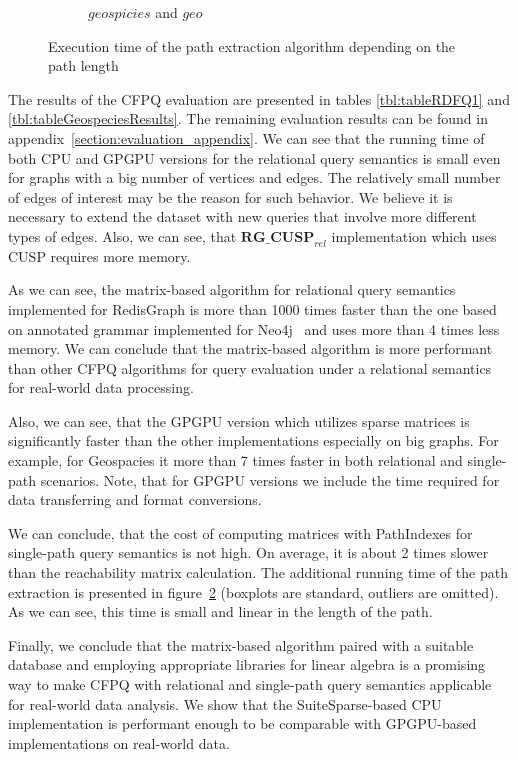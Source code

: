 \begin{figure}
\begin{subfigure}{0.32\textwidth}
		\caption{$geospicies$ and $geo$} \label{fig:extractTimeGeo}
	\end{subfigure}
	\caption{Execution time of the path extraction algorithm depending on the path length}
	\label{fig:extractTime}
\end{figure}

The results of the CFPQ evaluation are presented in tables \ref{tbl:tableRDFQ1} and \ref{tbl:tableGeospeciesResults}. The remaining evaluation results can be found in appendix~\ref{section:evaluation_appendix}.
We can see that the running time of both CPU and GPGPU versions for the relational query semantics is small even for graphs with a big number of vertices and edges.
The relatively small number of edges of interest may be the reason for such behavior.
We believe it is necessary to extend the dataset with new queries that involve more different types of edges.
Also, we can see, that $\textbf{RG\_CUSP}_{\textit{rel}}$ implementation which uses CUSP requires more memory.

As we can see, the matrix-based algorithm for relational query semantics implemented for RedisGraph is more than 1000 times faster than the one based on annotated grammar implemented for Neo4j~\cite{Kuijpers:2019:ESC:3335783.3335791} and uses more than 4 times less memory.
We can conclude that the matrix-based algorithm is more performant than other CFPQ algorithms for query evaluation under a relational semantics for real-world data processing.

Also, we can see, that the GPGPU version which utilizes sparse matrices is significantly faster than the other implementations especially on big graphs. For example, for Geospacies it more than 7 times faster in both relational and single-path scenarios.
Note, that for GPGPU versions we include the time required for data transferring and format conversions.

We can conclude, that the cost of computing matrices with PathIndexes for single-path query semantics is not high. On average, it is about 2 times slower than the reachability matrix calculation. The additional running time of the path extraction is presented in figure~\ref{fig:extractTime} (boxplots are standard, outliers are omitted). As we can see, this time is small and linear in the length of the path.

Finally, we conclude that the matrix-based algorithm paired with a suitable database and employing appropriate libraries for linear algebra is a promising way to make CFPQ with relational and single-path query semantics applicable for real-world data analysis.
We show that the SuiteSparse-based CPU implementation is performant enough to be comparable with GPGPU-based implementations on real-world data.


